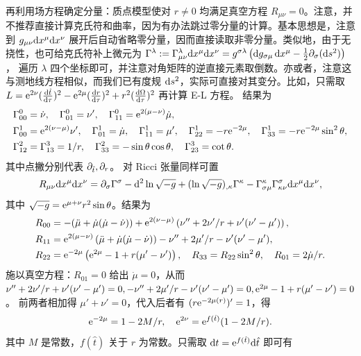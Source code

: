 再利用场方程确定分量：质点模型使对 $r\ne 0$ 均满足真空方程 $R_{\mu\nu}=0$。注意，并不推荐直接计算克氏符和曲率，因为有办法跳过零分量的计算。基本思想是，注意到 $g_{\mu\nu}\dd x^\mu\dd x^\nu$ 展开后自动省略零分量，因而直接读取非零分量。类似地，由于无挠性，也可给克氏符补上微元为
$\Gamma^\lambda:=\Gamma^\lambda_{\mu\nu}\dd x^\mu\dd x^\nu=g^{\sigma\lambda}\left(\dd g_{\sigma\mu}\,\dd x^\mu- \frac{1}{2} \partial_\sigma(\dd s^2)\right)$，
遍历 $\lambda$ 四个坐标即可，并注意对角矩阵的逆直接元素取倒数。亦或者，注意这与测地线方程相似，而我们已有度规 $\dd s^2$，实际可直接对其变分。比如，只需取 $L=\mathrm{e}^{2\nu}(\dv{\hat t}{\tau})^2-\mathrm{e}^{2\mu}(\dv{r}{\tau})^2+r^2(\dv{\Omega}{\tau})^2$ 再计算 E-L 方程。
结果为
\begin{align*}
    & \Gamma_{00}^0=\dot{\nu}, \quad \Gamma_{01}^0=\nu^{\prime}, \quad \Gamma_{11}^0=\mathrm{e}^{2(\mu-\nu)} \dot{\mu}, \\& \Gamma_{00}^1=\mathrm{e}^{2(\nu-\mu)} \nu^{\prime}, \quad \Gamma_{01}^1=\dot{\mu}, \quad \Gamma_{11}^1=\mu^{\prime}, \quad \Gamma_{22}^1=-r \mathrm{e}^{-2 \mu}, \quad \Gamma_{33}^1=-r \mathrm{e}^{-2 \mu} \sin ^2 \theta, \\
    & \Gamma_{12}^2=\Gamma_{13}^3={1}/{r}, \quad \Gamma_{33}^2=-\sin \theta \cos \theta, \quad \Gamma_{23}^3=\cot \theta.
\end{align*}
其中点撇分别代表 $\partial_{\hat t},\partial_{r}$。
对 Ricci 张量同样可置
\[R_{\mu\nu}\dd x^\mu\dd x^\nu=\partial_\sigma\Gamma^\sigma-\dd^2\ln\sqrt{-g}+(\ln\sqrt{-g})_{,\kappa}\Gamma^\kappa-\Gamma^\kappa_{\sigma\mu}\Gamma^\sigma_{\kappa\nu}\dd x^\mu\dd x^\nu,\]
其中 $\sqrt{-g}=\mathrm{e}^{\mu+\nu}r^2\sin\theta$。结果为
\begin{align*}
    R_{00} &= -(\ddot\mu+\dot\mu(\dot\mu-\dot\nu))+\mathrm{e}^{2(\nu-\mu)} \left(\nu''+2\nu'/r+\nu'(\nu'-\mu')\right), \\
    R_{11} &= \mathrm{e}^{2(\mu-\nu)} \left(\ddot\mu+\dot\mu(\dot\mu-\dot\nu)\right)-\nu''+2\mu'/r-\nu'(\nu'-\mu'), \\
    R_{22} &= \mathrm{e}^{-2\mu} \left(\mathrm{e}^{2\mu}-1+r(\mu'-\nu')\right), \quad R_{33} = R_{22} \sin ^2 \theta,\quad R_{01} = 2\dot\mu/r.
\end{align*}
施以真空方程：$R_{01}=0$ 给出 $\dot\mu=0$，从而
$\nu''+2\nu'/r+\nu'(\nu'-\mu')=0, 
-\nu''+2\mu'/r-\nu'(\nu'-\mu')=0, 
\mathrm{e}^{2\mu}-1+r(\mu'-\nu')=0$。
前两者相加得 $\mu'+\nu'=0$，代入后者有 $(r\mathrm{e}^{-2\mu(r)})'=1$，得
\[\mathrm{e}^{-2\mu}=1-{2M}/{r},\quad \mathrm{e}^{2\nu}=\mathrm{e}^{f(\hat t)}(1-{2M}/{r}).\]
其中 $M$ 是常数，$f(\hat t)$ 关于 $r$ 为常数。只需取 $\dd t=\mathrm{e}^{f(\hat t)}\dd\hat t$ 即可有
